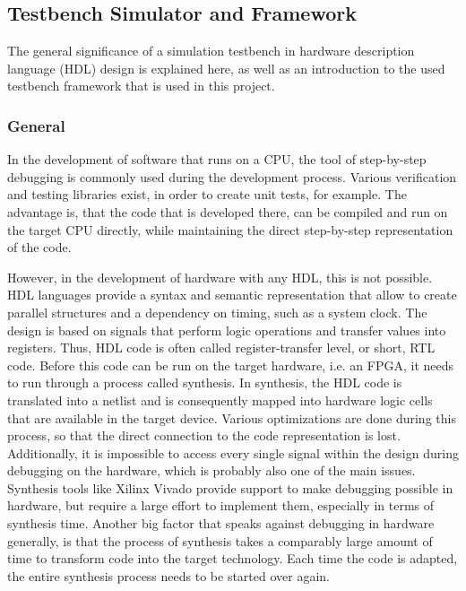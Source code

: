 \subsection{Testbench Simulator and Framework}

The general significance of a simulation testbench in hardware description language (HDL) design is explained here, as well as an introduction to the used testbench framework that is used in this project.

\subsubsection{General}
\label{sub:VHDL:Testbench:General}

In the development of software that runs on a CPU, the tool of step-by-step debugging is commonly used during the development process.
Various verification and testing libraries exist, in order to create unit tests, for example.
The advantage is, that the code that is developed there, can be compiled and run on the target CPU directly, while maintaining the direct step-by-step representation of the code.

However, in the development of hardware with any HDL, this is not possible.
HDL languages provide a syntax and semantic representation that allow to create parallel structures and a dependency on timing, such as a system clock.
The design is based on signals that perform logic operations and transfer values into registers.
Thus, HDL code is often called register-transfer level, or short, RTL code.
Before this code can be run on the target hardware, i.e. an FPGA, it needs to run through a process called synthesis.
In synthesis, the HDL code is translated into a netlist and is consequently mapped into hardware logic cells that are available in the target device.
Various optimizations are done during this process, so that the direct connection to the code representation is lost.
Additionally, it is impossible to access every single signal within the design during debugging on the hardware, which is probably also one of the main issues.
Synthesis tools like Xilinx Vivado provide support to make debugging possible in hardware, but require a large effort to implement them, especially in terms of synthesis time.
Another big factor that speaks against debugging in hardware generally, is that the process of synthesis takes a comparably large amount of time to transform code into the target technology.
Each time the code is adapted, the entire synthesis process needs to be started over again.

